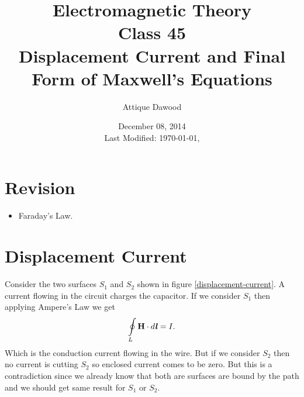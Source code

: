 \documentclass[12pt,a4paper]{article}
\title{Electromagnetic Theory\\Class 45\\Displacement Current and Final Form of Maxwell's Equations}
\author{Attique Dawood}
\date{December 08, 2014\\[0.2cm] Last Modified: \today, \currenttime}
\begin{document}
\maketitle
\section{Revision}
\begin{itemize}
\item Faraday's Law.
\end{itemize}
\section{Displacement Current}
Consider the two surfaces $S_1$ and $S_2$ shown in figure \ref{displacement-current}. A current flowing in the circuit charges the capacitor. If we consider $S_1$ then applying Ampere's Law we get
\begin{equation}
\oint\limits_{L} \textbf{H}\cdot d\textbf{\textit{l}}=I.
\end{equation}
Which is the conduction current flowing in the wire. But if we consider $S_2$ then no current is cutting $S_2$ so enclosed current comes to be zero. But this is a contradiction since we already know that both are surfaces are bound by the path and we should get same result for $S_1$ or $S_2$.
\end{document}
